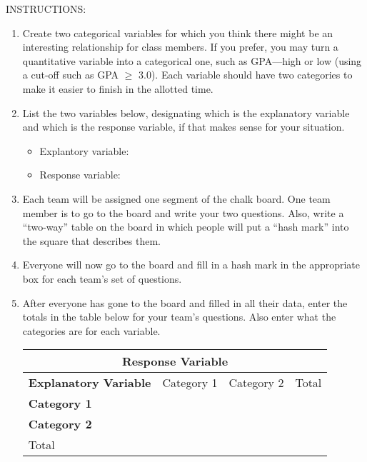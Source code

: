 \noindent INSTRUCTIONS:
\begin{enumerate}[leftmargin=1cm, itemsep=.2em]
\item Create two categorical variables for which you think there might be an interesting relationship for class members. If you prefer, you may turn a quantitative variable into a categorical one, such as GPA---high or low (using a cut-off such as GPA $\geq$ 3.0). Each variable should have two categories to make it easier to finish in the allotted time.
\item List the two variables below, designating which is the explanatory variable and which is the response variable, if that makes sense for your situation. 

\renewcommand{\labelitemi}{$\filledsquare$}
	\begin{itemize}[leftmargin=1cm, itemsep=.2em]
	\item Explantory variable:
	\vspace{.05\textheight}
	\item Response variable:
	\vspace{.05\textheight}
	\end{itemize}
\item Each team will be assigned one segment of the chalk board. One team member is to go to the board and write your two questions. Also, write a ``two-way'' table on the board in which people will put a ``hash mark'' into the square that describes them.
\item Everyone will now go to the board and fill in a hash mark in the appropriate box for each team's set of questions. 
\item After everyone has gone to the board and filled in all their data, enter the totals in the table below for your team's questions. Also enter what the categories are for each variable. \\ 

\begin{table}
\begin{center}
\begin{tabular}{|l|c|c|c|}
\multicolumn{4}{c}{\hspace{1.8in} Response Variable}\\
\hline
\textbf{Explanatory Variable} & Category 1 & Category 2 & Total\\[.2em]
  \hline
\textbf{Category 1} & & & \\[.6em]
\hline
\textbf{Category 2} & & & \\[.6em]
\hline
Total & & & \\[.6em]
\hline
\end{tabular}
\end{center}
\end{table}
\newpage



\end{enumerate}
